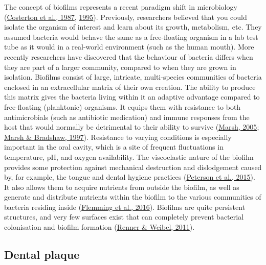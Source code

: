 \documentclass[
  letterpaper,
]{book}
\begin{document}
The concept of biofilms represents a recent paradigm shift in
microbiology
(\protect\hyperlink{ref-costertonBacterialBiofilms1987}{Costerton et
al., 1987},
\protect\hyperlink{ref-costertonMicrobialBiofilms1995}{1995}).
Previously, researchers believed that you could isolate the organism of
interest and learn about its growth, metabolism, etc. They assumed
bacteria would behave the same as a free-floating organism in a lab test
tube as it would in a real-world environment (such as the human mouth).
More recently researchers have discovered that the behaviour of bacteria
differs when they are part of a larger community, compared to when they
are grown in isolation. Biofilms consist of large, intricate,
multi-species communities of bacteria enclosed in an extracellular
matrix of their own creation. The ability to produce this matrix gives
the bacteria living within it an adaptive advantage compared to
free-floating (planktonic) organisms. It equips them with resistance to
both antimicrobials (such as antibiotic medication) and immune responses
from the host that would normally be detrimental to their ability to
survive (\protect\hyperlink{ref-marshDentalPlaque2005}{Marsh, 2005};
\protect\hyperlink{ref-marshPhysiologicalApproaches1997}{Marsh \&
Bradshaw, 1997}). Resistance to varying conditions is especially
important in the oral cavity, which is a site of frequent fluctuations
in temperature, pH, and oxygen availability. The viscoelastic nature of
the biofilm provides some protection against mechanical destruction and
dislodgement caused by, for example, the tongue and dental hygiene
practices
(\protect\hyperlink{ref-petersonViscoelasticityBiofilms2015}{Peterson et
al., 2015}). It also allows them to acquire nutrients from outside the
biofilm, as well as generate and distribute nutrients within the biofilm
to the various communities of bacteria residing inside
(\protect\hyperlink{ref-flemmingBiofilmsEmergent2016}{Flemming et al.,
2016}). Biofilms are quite persistent structures, and very few surfaces
exist that can completely prevent bacterial colonisation and biofilm
formation
(\protect\hyperlink{ref-rennerPhysicochemicalRegulation2011}{Renner \&
Weibel, 2011}).

\hypertarget{dental-plaque}{%
\subsection{Dental plaque}\label{dental-plaque}}
\end{document}
